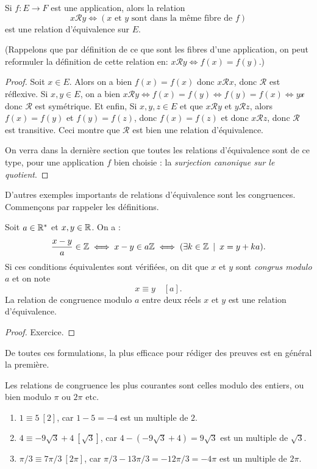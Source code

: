 \begin{proposition}
Si $f : E\to F$ est une application, alors la relation 
\[
x\mathcal R y \iff (x\text{ et }y \text{ sont dans la même fibre de }f)
\]
est une relation d'équivalence sur $E$.

(Rappelons que par définition de ce que sont les fibres d'une application, on peut reformuler la définition de cette relation en: $x\mathcal R y \iff f(x)=f(y)$.)
\end{proposition}
\begin{proof}
Soit $x \in E$. Alors on a bien $f(x)=f(x)$ donc $x\mathcal R x$, donc $\mathcal R$ est réflexive. Si $x, y\in E$, on a bien $x\mathcal R y \iff f(x)=f(y) \iff f(y)=f(x) \iff y\mathcal x$ donc $\mathcal R$ est symétrique. Et enfin, Si $x,y,z\in E$ et que $x\mathcal R y$ et $y\mathcal R z$, alors $f(x)=f(y)$ et $f(y)=f(z)$, donc $f(x)=f(z)$ et donc $x\mathcal R z$, donc $\mathcal R$ est transitive. Ceci montre que $\mathcal R$ est bien une relation d'équivalence.

On verra dans la dernière section que toutes les relations d'équivalence sont de ce type, pour une application $f$ bien choisie : la \emph{surjection canonique sur le quotient}.
\end{proof}

D'autres exemples importants de relations d'équivalence sont les congruences. Commençons par rappeler les définitions.

\begin{propdef}
Soit $a\in \mathbb{R}^*$ et $x,y\in\mathbb{R}$. On a :
\[
\frac{x-y}{a}\in \mathbb{Z} 
\iff
x-y \in a\mathbb{Z}
\iff 
(\exists k\in \mathbb{Z}\:\mid\: x=y+ka).
\]
Si ces conditions équivalentes sont vérifiées, on dit que $x$ et $y$ sont \emph{congrus modulo $a$} et on note 
\[ x\equiv y\quad [a].\]
La relation de congruence modulo $a$ entre deux réels $x$ et $y$ est une relation d'équivalence.
\end{propdef}
\begin{proof}
Exercice.
\end{proof}

De toutes ces formulations, la plus efficace pour rédiger des preuves est en général la première.

Les relations de congruence les plus courantes sont celles modulo des entiers, ou bien modulo $\pi$ ou $2\pi$ etc.


\begin{exemples}
\begin{enumerate}[label=\alph*)]
\item $1 \equiv 5 \: [2]$, car $1-5 = -4$ est un multiple de $2$.
\item $4\equiv -9\sqrt{3}+4 \: [\sqrt{3}]$, car $4 - (-9\sqrt{3}+4) = 9\sqrt{3}$ est un multiple de $\sqrt{3}$.
\item $\pi/3 \equiv 7\pi/3 \: [2\pi]$, car $\pi/3 - 13\pi/3 = -12\pi/3 = -4\pi$ est un multiple de $2\pi$.
\end{enumerate}
\end{exemples}

